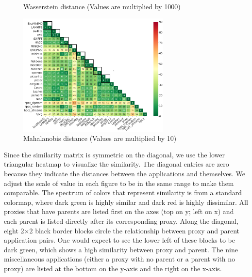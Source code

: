 \begin{figure}[htbp]
\begin{minipage}[t]{0.48\textwidth}
	\vspace*{-5mm}
	\caption{Wasserstein distance (Values are multiplied by 1000)}
	\label{figs:Wasserstein}
	\end{minipage}
\hspace{.1in}	
\begin{minipage}[t]{0.48\textwidth}
	\centering
	\includegraphics[width=3in]{figs/Mahalanobis distance_m10.png}
	\vspace*{-5mm}
	\caption{Mahalanobis distance (Values are multiplied by 10)}
	\label{figs:Mahalanobis}
	\end{minipage}
\hspace{.1in}
\end{figure}

Since the similarity matrix is symmetric on the diagonal, we use the lower triangular heatmap to visualize the similarity. The diagonal entries are zero because they indicate the distances between the applications and themselves. We adjust the scale of value in each figure to be in the same range to make them comparable. The spectrum of colors that represent similarity is from a standard colormap, where dark green is highly similar and dark red is highly dissimilar. All proxies that have parents are listed first on the axes (top on y; left on x) and each parent is listed directly after its corresponding proxy. Along the diagonal, eight 2$\times$2 black border blocks circle the relationship between proxy and parent application pairs. One would expect to see the lower left of these blocks to be dark green, which shows a high similarity between proxy and parent. The nine miscellaneous applications (either a proxy with no parent or a parent with no proxy) are listed at the bottom on the y-axis and the right on the x-axis. 

